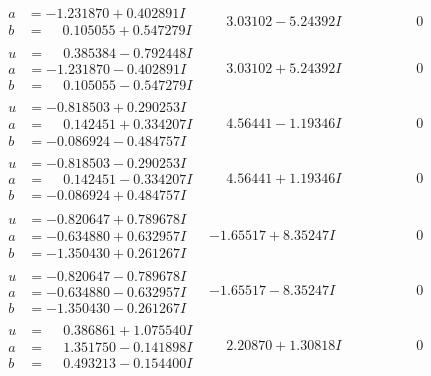 \documentclass[1p]{elsarticle_modified}
\theoremstyle{definition}
\begin{document}
$$\begin{array}{c|c|c}
\begin{aligned}
a &= -1.231870 + 0.402891 I \\
b &= \phantom{-}0.105055 + 0.547279 I\end{aligned}
 & \phantom{-}3.03102 - 5.24392 I & \phantom{-0.000000 } 0 \\ \hline\begin{aligned}
u &= \phantom{-}0.385384 - 0.792448 I \\
a &= -1.231870 - 0.402891 I \\
b &= \phantom{-}0.105055 - 0.547279 I\end{aligned}
 & \phantom{-}3.03102 + 5.24392 I & \phantom{-0.000000 } 0 \\ \hline\begin{aligned}
u &= -0.818503 + 0.290253 I \\
a &= \phantom{-}0.142451 + 0.334207 I \\
b &= -0.086924 - 0.484757 I\end{aligned}
 & \phantom{-}4.56441 - 1.19346 I & \phantom{-0.000000 } 0 \\ \hline\begin{aligned}
u &= -0.818503 - 0.290253 I \\
a &= \phantom{-}0.142451 - 0.334207 I \\
b &= -0.086924 + 0.484757 I\end{aligned}
 & \phantom{-}4.56441 + 1.19346 I & \phantom{-0.000000 } 0 \\ \hline\begin{aligned}
u &= -0.820647 + 0.789678 I \\
a &= -0.634880 + 0.632957 I \\
b &= -1.350430 + 0.261267 I\end{aligned}
 & -1.65517 + 8.35247 I & \phantom{-0.000000 } 0 \\ \hline\begin{aligned}
u &= -0.820647 - 0.789678 I \\
a &= -0.634880 - 0.632957 I \\
b &= -1.350430 - 0.261267 I\end{aligned}
 & -1.65517 - 8.35247 I & \phantom{-0.000000 } 0 \\ \hline\begin{aligned}
u &= \phantom{-}0.386861 + 1.075540 I \\
a &= \phantom{-}1.351750 - 0.141898 I \\
b &= \phantom{-}0.493213 - 0.154400 I\end{aligned}
 & \phantom{-}2.20870 + 1.30818 I & \phantom{-0.000000 } 0 \\ \hline\begin{aligned}

\end{aligned}
\end{array}$$
\end{document}

